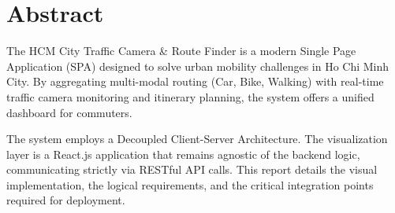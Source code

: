 \thispagestyle{plain}

\section*{Abstract}
\label{sec:abstract}
The HCM City Traffic Camera \& Route Finder is a modern Single Page Application (SPA) designed to solve urban mobility challenges in Ho Chi Minh City. By aggregating multi-modal routing (Car, Bike, Walking) with real-time traffic camera monitoring and itinerary planning, the system offers a unified dashboard for commuters.

The system employs a Decoupled Client-Server Architecture. The visualization layer is a React.js application that remains agnostic of the backend logic, communicating strictly via RESTful API calls. This report details the visual implementation, the logical requirements, and the critical integration points required for deployment.

